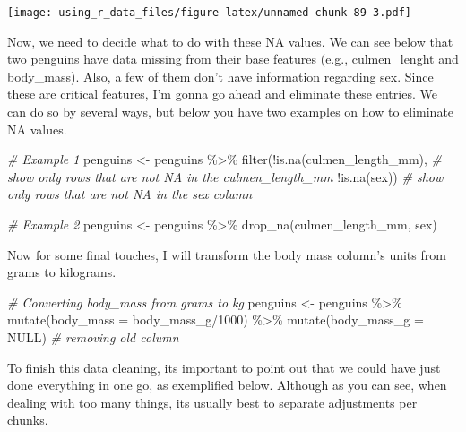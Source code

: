 \documentclass[
]{book}
\newenvironment{Shaded}{\begin{snugshade}}{\end{snugshade}}
\newcommand{\AttributeTok}[1]{\textcolor[rgb]{0.77,0.63,0.00}{#1}}
\newcommand{\CommentTok}[1]{\textcolor[rgb]{0.56,0.35,0.01}{\textit{#1}}}
\newcommand{\ConstantTok}[1]{\textcolor[rgb]{0.00,0.00,0.00}{#1}}
\newcommand{\DecValTok}[1]{\textcolor[rgb]{0.00,0.00,0.81}{#1}}
\newcommand{\FunctionTok}[1]{\textcolor[rgb]{0.00,0.00,0.00}{#1}}
\newcommand{\NormalTok}[1]{#1}
\newcommand{\OtherTok}[1]{\textcolor[rgb]{0.56,0.35,0.01}{#1}}
\newcommand{\SpecialCharTok}[1]{\textcolor[rgb]{0.00,0.00,0.00}{#1}}
\begin{document}
\texttt{[image: using\_r\_data\_files/figure-latex/unnamed-chunk-89-3.pdf]}

Now, we need to decide what to do with these NA values.
We can see below that two penguins have data missing from their base features (e.g., culmen\_lenght and body\_mass).
Also, a few of them don't have information regarding sex.
Since these are critical features, I'm gonna go ahead and eliminate these entries.
We can do so by several ways, but below you have two examples on how to eliminate NA values.

\begin{Shaded}
\begin{Highlighting}[]
\CommentTok{\# Example 1}
\NormalTok{penguins }\OtherTok{\textless{}{-}}\NormalTok{ penguins }\SpecialCharTok{\%\textgreater{}\%} 
  \FunctionTok{filter}\NormalTok{(}\SpecialCharTok{!}\FunctionTok{is.na}\NormalTok{(culmen\_length\_mm),  }\CommentTok{\# show only rows that are not NA in the culmen\_length\_mm}
         \SpecialCharTok{!}\FunctionTok{is.na}\NormalTok{(sex)) }\CommentTok{\# show only rows that are not NA in the sex column}

\CommentTok{\# Example 2}
\NormalTok{penguins }\OtherTok{\textless{}{-}}\NormalTok{ penguins }\SpecialCharTok{\%\textgreater{}\%} 
  \FunctionTok{drop\_na}\NormalTok{(culmen\_length\_mm, sex)}
\end{Highlighting}
\end{Shaded}

Now for some final touches, I will transform the body mass column's units from grams to kilograms.

\begin{Shaded}
\begin{Highlighting}[]
\CommentTok{\# Converting body\_mass from grams to kg}
\NormalTok{penguins }\OtherTok{\textless{}{-}}\NormalTok{ penguins }\SpecialCharTok{\%\textgreater{}\%} 
  \FunctionTok{mutate}\NormalTok{(}\AttributeTok{body\_mass =}\NormalTok{ body\_mass\_g}\SpecialCharTok{/}\DecValTok{1000}\NormalTok{) }\SpecialCharTok{\%\textgreater{}\%} 
  \FunctionTok{mutate}\NormalTok{(}\AttributeTok{body\_mass\_g =} \ConstantTok{NULL}\NormalTok{)  }\CommentTok{\# removing old column}
\end{Highlighting}
\end{Shaded}

To finish this data cleaning, its important to point out that we could have just done everything in one go, as exemplified below.
Although as you can see, when dealing with too many things, its usually best to separate adjustments per chunks.
\end{document}
